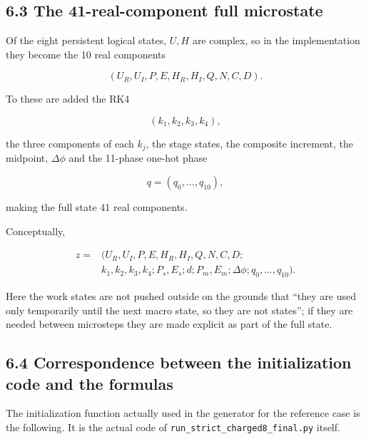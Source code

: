 \documentclass[
  a4paper,
]{article}
\begin{document}
\subsection{6.3 The 41-real-component full
microstate}\label{the-41-real-component-full-microstate}

Of the eight persistent logical states, \(U,H\) are complex, so in the
implementation they become the 10 real components

\[
(U_R,U_I,P,E,H_R,H_I,Q,N,C,D).
\]

To these are added the RK4

\[
(k_1,k_2,k_3,k_4),
\]

the three components of each \(k_j\), the stage states, the composite
increment, the midpoint, \(\Delta\phi\) and the 11-phase one-hot phase

\[
q=(q_0,\ldots,q_{10}),
\]

making the full state 41 real components.

Conceptually,

\[
\begin{aligned}
z=&(U_R,U_I,P,E,H_R,H_I,Q,N,C,D;\\
&k_1,k_2,k_3,k_4;P_s,E_s;d;P_m,E_m;\Delta\phi;q_0,\ldots,q_{10}).
\end{aligned}
\]

Here the work states are not pushed outside on the grounds that ``they
are used only temporarily until the next macro state, so they are not
states''; if they are needed between microsteps they are made explicit
as part of the full state.

\subsection{6.4 Correspondence between the initialization code and the
formulas}\label{correspondence-between-the-initialization-code-and-the-formulas}

The initialization function actually used in the generator for the
reference case is the following. It is the actual code of
\texttt{run\_strict\_charged8\_final.py} itself.
\end{document}
